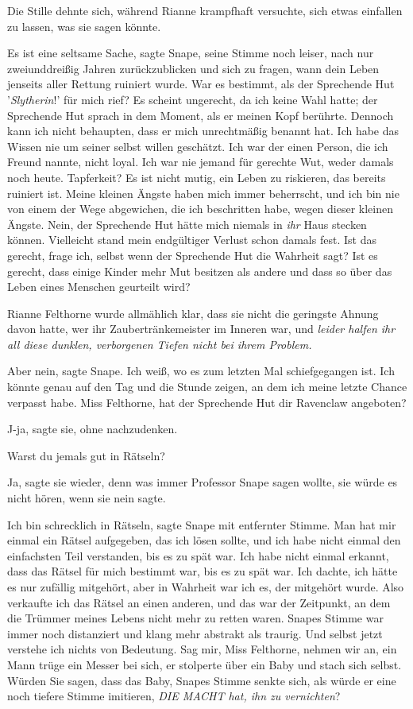 Die Stille dehnte sich, während Rianne krampfhaft versuchte, sich etwas
einfallen zu lassen, was sie sagen könnte.

\glqq{}Es ist eine seltsame Sache\grqq{}, sagte Snape, seine Stimme noch leiser,
\glqq{}nach nur zweiunddreißig Jahren zurückzublicken und sich zu fragen, wann
dein Leben jenseits aller Rettung ruiniert wurde. War es bestimmt, als der
Sprechende Hut '\emph{Slytherin}!' für mich rief? Es scheint ungerecht, da ich
keine Wahl hatte; der Sprechende Hut sprach in dem Moment, als er meinen Kopf
berührte. Dennoch kann ich nicht behaupten, dass er mich unrechtmäßig benannt
hat. Ich habe das Wissen nie um seiner selbst willen geschätzt. Ich war der
einen Person, die ich Freund nannte, nicht loyal. Ich war nie jemand für
gerechte Wut, weder damals noch heute. Tapferkeit? Es ist nicht mutig, ein Leben
zu riskieren, das bereits ruiniert ist. Meine kleinen Ängste haben mich immer
beherrscht, und ich bin nie von einem der Wege abgewichen, die ich beschritten
habe, wegen dieser kleinen Ängste. Nein, der Sprechende Hut hätte mich niemals
in \emph{ihr} Haus stecken können. Vielleicht stand mein endgültiger Verlust
schon damals fest. Ist das gerecht, frage ich, selbst wenn der Sprechende Hut
die Wahrheit sagt? Ist es gerecht, dass einige Kinder mehr Mut besitzen als
andere und dass so über das Leben eines Menschen geurteilt wird?\grqq{}

Rianne Felthorne wurde allmählich klar, dass sie nicht die geringste Ahnung
davon hatte, wer ihr Zaubertränkemeister im Inneren war, und \emph{leider halfen
ihr all diese dunklen, verborgenen Tiefen nicht bei ihrem Problem.}

\glqq{}Aber nein\grqq{}, sagte Snape. \glqq{}Ich weiß, wo es zum letzten Mal
schiefgegangen ist. Ich könnte genau auf den Tag und die Stunde zeigen, an dem
ich meine letzte Chance verpasst habe. Miss Felthorne, hat der Sprechende Hut
dir Ravenclaw angeboten?\grqq{}

\glqq{}J-ja\grqq{}, sagte sie, ohne nachzudenken.

\glqq{}Warst du jemals gut in Rätseln?\grqq{}

\glqq{}Ja\grqq{}, sagte sie wieder, denn was immer Professor Snape sagen wollte,
sie würde es nicht hören, wenn sie nein sagte.

\glqq{}Ich bin schrecklich in Rätseln\grqq{}, sagte Snape mit entfernter Stimme.
\glqq{}Man hat mir einmal ein Rätsel aufgegeben, das ich lösen sollte, und ich
habe nicht einmal den einfachsten Teil verstanden, bis es zu spät war. Ich habe
nicht einmal erkannt, dass das Rätsel für mich bestimmt war, bis es zu spät war.
Ich dachte, ich hätte es nur zufällig mitgehört, aber in Wahrheit war ich es,
der mitgehört wurde. Also verkaufte ich das Rätsel an einen anderen, und das war
der Zeitpunkt, an dem die Trümmer meines Lebens nicht mehr zu retten
waren.\grqq{} Snapes Stimme war immer noch distanziert und klang mehr abstrakt
als traurig. \glqq{}Und selbst jetzt verstehe ich nichts von Bedeutung. Sag mir,
Miss Felthorne, nehmen wir an, ein Mann trüge ein Messer bei sich, er stolperte
über ein Baby und stach sich selbst. Würden Sie sagen, dass das Baby\grqq{},
Snapes Stimme senkte sich, als würde er eine noch tiefere Stimme imitieren,
\glqq{}\emph{DIE MACHT hat, ihn zu vernichten}?\grqq{}

